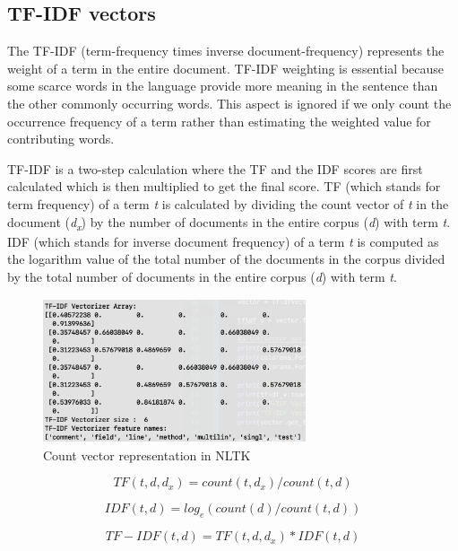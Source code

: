 \documentclass[conference]{IEEEtran}
\begin{document}
\subsection{TF-IDF vectors}

The TF-IDF (term-frequency times inverse document-frequency) represents the weight of a term in the entire document. TF-IDF weighting is essential because some scarce words in the language provide more meaning in the sentence than the other commonly occurring words. This aspect is ignored if we only count the occurrence frequency of a term rather than estimating the weighted value for contributing words.  

TF-IDF is a two-step calculation where the TF and the IDF scores are first calculated which is then multiplied to get the final score. TF (which stands for term frequency) of a term \textit{t} is calculated by dividing the count vector of \textit{t} in the document (\textit{d\textsubscript{x}}) by the number of documents in the entire corpus (\textit{d}) with term \textit{t}. IDF (which stands for inverse document frequency) of a term \textit{t} is computed as the logarithm value of the total number of the documents in the corpus divided by the total number of documents in the entire corpus (\textit{d}) with term \textit{t}. \cite{scikit-learn}

\begin{figure}[!h]
\centerline{\includegraphics[width=7.75cm, height=4.25cm]{graphics/tfidf-vec.png}}
\caption{Count vector representation in NLTK}
\label{fig}
\end{figure}

\begin{equation}
\label{tf-calculation}
TF(t,d,d_x) = count(t,d_x) / count(t,d)
\end{equation}

\begin{equation}
\label{tf-calculation}
IDF(t,d) = log_e (count(d) / count(t,d))
\end{equation}

\begin{equation}
\label{tf-calculation}
TF-IDF(t,d) = TF(t,d,d_x) * IDF(t,d)
\end{equation}
\end{document}
